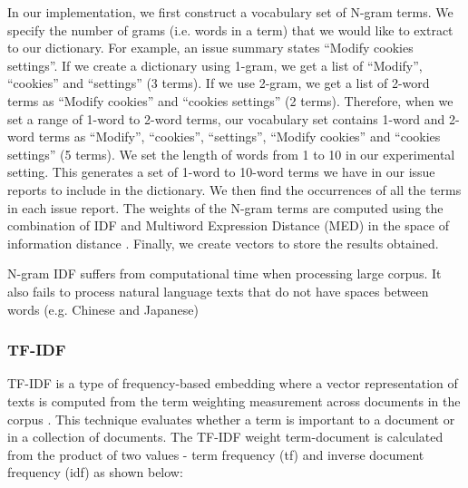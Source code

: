 In our implementation, we first construct a vocabulary set of N-gram terms. We specify the number of grams (i.e. words in a term) that we would like to extract to our dictionary. For example, an issue summary states ``Modify cookies settings''. If we create a dictionary using 1-gram, we get a list of ``Modify'', ``cookies'' and ``settings'' (3 terms). If we use 2-gram, we get a list of 2-word terms as ``Modify cookies'' and ``cookies settings'' (2 terms). Therefore, when we set a range of 1-word to 2-word terms, our vocabulary set contains 1-word and 2-word terms as ``Modify'', ``cookies'', ``settings'', ``Modify cookies'' and ``cookies settings'' (5 terms). We set the length of words from 1 to 10 in our experimental setting. This generates a set of 1-word to 10-word terms we have in our issue reports to include in the dictionary. We then find the occurrences of all the terms in each issue report. The weights of the N-gram terms are computed using the combination of IDF and Multiword Expression Distance (MED) in the space of information distance \cite{Shirakawa2015}. Finally, we create vectors to store the results obtained.

N-gram IDF suffers from computational time when processing large corpus. It also fails to process natural language texts that do not have spaces between words (e.g. Chinese and Japanese)

\subsubsection{TF-IDF} \label{subsec:TF-IDF}

TF-IDF is a type of frequency-based embedding where a vector representation of texts is computed from the term weighting measurement across documents in the corpus \cite{blei2003latent}. This technique evaluates whether a term is important to a document or in a collection of documents. The TF-IDF weight term-document is calculated from the product of two values - term frequency (tf) and inverse document frequency (idf) as shown below:

